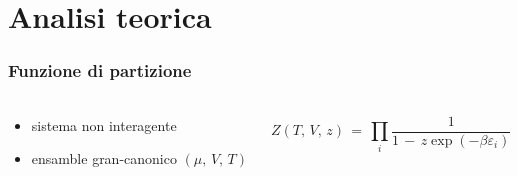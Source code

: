 \section{Analisi teorica}


\begin{frame}
  \frametitle{Funzione di partizione}
  \framesubtitle{}

  \begin{columns}
    \begin{column}{0.4\textwidth}
      \begin{itemize}[itemsep=0.5em, label=$\bullet$]
        \item sistema non interagente
        \item ensamble gran-canonico $\left(\mu,\,V,\,T\right)$
      \end{itemize}
    \end{column}
    
    \begin{column}{0.6\textwidth}

      $$
      Z\left(T,\,V,\,z\right)\,=\,\prod_i \frac{1}{1\,-\,z\exp{\left(-\beta \varepsilon_i \right)}}
      $$
      
    \end{column}
  \end{columns}

\end{frame}


